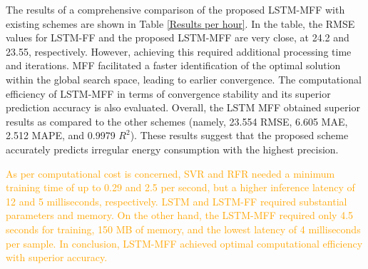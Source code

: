 \documentclass[journal]{IEEEtran}
\begin{document}
   \begin{table}[!h]
    \centering
\end{table}


The results of a comprehensive comparison of the proposed LSTM-MFF with existing schemes are shown in Table \ref{Results per hour}. In the table, the RMSE values for LSTM-FF and the proposed LSTM-MFF are very close, at 24.2 and 23.55, respectively. However, achieving this required additional processing time and iterations. MFF facilitated a faster identification of the optimal solution within the global search space, leading to earlier convergence. The computational efficiency of LSTM-MFF in terms of convergence stability and its superior prediction accuracy is also evaluated. Overall, the LSTM MFF obtained superior results as compared to the other schemes (namely, 23.554 RMSE, 6.605 MAE, 2.512 MAPE, and 0.9979 $R^2$). These results suggest that the proposed scheme accurately predicts irregular energy consumption with the highest precision.

\textcolor{orange}{As per computational cost is concerned, SVR and RFR needed a minimum training time of up to 0.29 and 2.5 per second, but a higher inference latency of 12 and 5 milliseconds, respectively. LSTM and LSTM-FF required substantial parameters and memory. On the other hand, the LSTM-MFF required only 4.5 seconds for training, 150 MB of memory, and the lowest latency of 4 milliseconds per sample. In conclusion, LSTM-MFF achieved optimal computational efficiency with superior accuracy.}  
\end{document}
